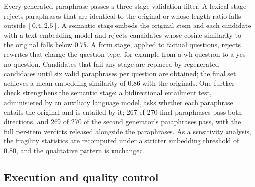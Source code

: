 Every generated paraphrase passes a three-stage validation filter. A lexical stage rejects paraphrases that are identical to the original or whose length ratio falls outside $[0.4, 2.5]$. A semantic stage embeds the original stem and each candidate with a text embedding model and rejects candidates whose cosine similarity to the original falls below $0.75$. A form stage, applied to factual questions, rejects rewrites that change the question type, for example from a wh-question to a yes-no question. Candidates that fail any stage are replaced by regenerated candidates until six valid paraphrases per question are obtained; the final set achieves a mean embedding similarity of $0.86$ with the originals. One further check strengthens the semantic stage: a bidirectional entailment test, administered by an auxiliary language model, asks whether each paraphrase entails the original and is entailed by it; 267 of 270 final paraphrases pass both directions, and 269 of 270 of the second generator's paraphrases pass, with the full per-item verdicts released alongside the paraphrases. As a sensitivity analysis, the fragility statistics are recomputed under a stricter embedding threshold of 0.80, and the qualitative pattern is unchanged.

\subsection{Execution and quality control}


